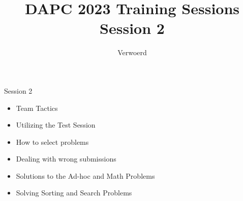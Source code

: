 \documentclass[11pt,pdf, aspectratio=169]{beamer}
\title{DAPC 2023 Training Sessions\\Session 2}
\author{Verwoerd}
\begin{document}
  \maketitle
  \begin{frame}{Session 2}
    \begin{itemize}
      \item Team Tactics
      \item Utilizing the Test Session
      \item How to select problems
      \item Dealing with wrong submissions
      \item Solutions to the Ad-hoc and Math Problems
      \item Solving Sorting and Search Problems
    \end{itemize}
    \doclicenseThis
  \end{frame}
\end{document}
